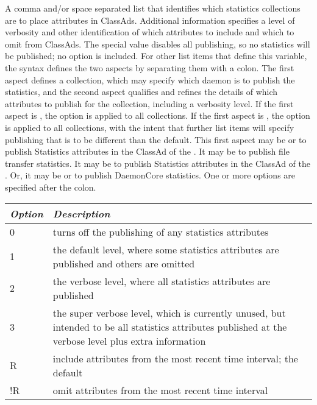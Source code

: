 \begin{description}
\label{param:StatisticsToPublish}
\item[\Macro{STATISTICS\_TO\_PUBLISH}]
  A comma and/or space separated list that identifies which 
  statistics collections are to place attributes in ClassAds. 
  Additional information specifies a level of
  verbosity and other identification of which attributes to include 
  and which to omit from ClassAds. 
  The special value  disables all publishing, so no statistics
  will be published; no option is included.
  For other list items that define this variable,
  the syntax defines the two aspects by separating them with a colon.
  The first aspect defines a collection, 
  which may specify which daemon is to publish the statistics,
  and the second aspect qualifies and refines the details of which attributes 
  to publish for the collection, including a verbosity level.
  If the first aspect is ,
  the option is applied to all collections.
  If the first aspect is ,
  the option is applied to all collections, 
  with the intent that further list items will specify publishing that
  is to be different than the default.
  This first aspect may be  or  to publish
  Statistics attributes in the ClassAd of the .
  It may be  to publish file transfer statistics.
  It may be  to publish
  Statistics attributes in the ClassAd of the .
  Or, it may be  or  to publish 
  DaemonCore statistics.  
  One or more options are specified after the colon.
\begin{center}
\begin{table}[hbt]
\begin{tabular}{|p{2cm}p{12cm}|} \hline
\emph{Option} & \emph{Description} \\ \hline \hline
0 & turns off the publishing of any statistics attributes \\ \hline
1 & the default level, where some statistics attributes
  are published and others are omitted \\ \hline
2 & the verbose level, where all statistics attributes
  are published \\ \hline
3 & the super verbose level, which is currently unused,
  but intended to be all statistics attributes published at the verbose
  level plus extra information \\ \hline
R & include attributes from the most recent time interval;
the default \\ \hline
!R & omit attributes from the most recent time interval \\ \hline

\end{tabular}
\end{table}
\end{center}
\end{description}
